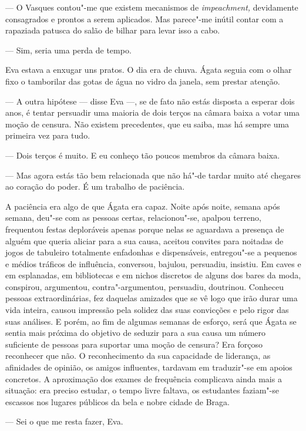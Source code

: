 --- O Vasques contou"-me que existem mecanismos de \emph{impeachment,
  }devidamente consagrados e prontos a serem aplicados. Mas parece"-me
  inútil contar com a rapaziada patusca do salão de bilhar para levar
  isso a cabo.


--- Sim, seria uma perda de tempo.


Eva estava a enxugar uns pratos. O dia era de chuva. Ágata seguia com
o olhar fixo o tamborilar das gotas de água no vidro da janela, sem
prestar atenção.

--- A outra hipótese --- disse Eva ---, se de fato não estás disposta a
  esperar dois anos, é tentar persuadir uma maioria de dois terços na
  câmara baixa a votar uma moção de censura. Não existem precedentes,
  que eu saiba, mas há sempre uma primeira vez para tudo.

--- Dois terços é muito. E eu conheço tão poucos membros da câmara
  baixa.

--- Mas agora estás tão bem relacionada que não há"-de tardar muito até
  chegares ao coração do poder. É um trabalho de paciência.


A paciência era algo de que Ágata era capaz. Noite após noite, semana
após semana, deu"-se com as pessoas certas, relacionou"-se, apalpou
terreno, frequentou festas deploráveis apenas porque nelas se aguardava
a presença de alguém que queria aliciar para a sua causa, aceitou
convites para noitadas de jogos de tabuleiro totalmente enfadonhas e
dispensáveis, entregou"-se a pequenos e médios tráficos de influência,
conversou, bajulou, persuadiu, insistiu. Em caves e em esplanadas, em
bibliotecas e em nichos discretos de alguns dos bares da moda,
conspirou, argumentou, contra"-argumentou, persuadiu, doutrinou.
Conheceu pessoas extraordinárias, fez daquelas amizades que se vê logo
que irão durar uma vida inteira, causou impressão pela solidez das
suas convicções e pelo rigor das suas análises. E porém, ao fim de
algumas semanas de esforço, será que Ágata se sentia mais próxima do
objetivo de seduzir para a sua causa um número suficiente de pessoas
para suportar uma moção de censura? Era forçoso reconhecer
que não. O reconhecimento da sua capacidade de liderança, as afinidades
de opinião, os amigos influentes, tardavam em traduzir"-se em apoios
concretos. A aproximação dos exames de frequência complicava ainda mais
a situação: era preciso estudar, o tempo livre faltava, os estudantes
faziam"-se escassos nos lugares públicos da bela e nobre cidade de Braga.

--- Sei o que me resta fazer, Eva.

